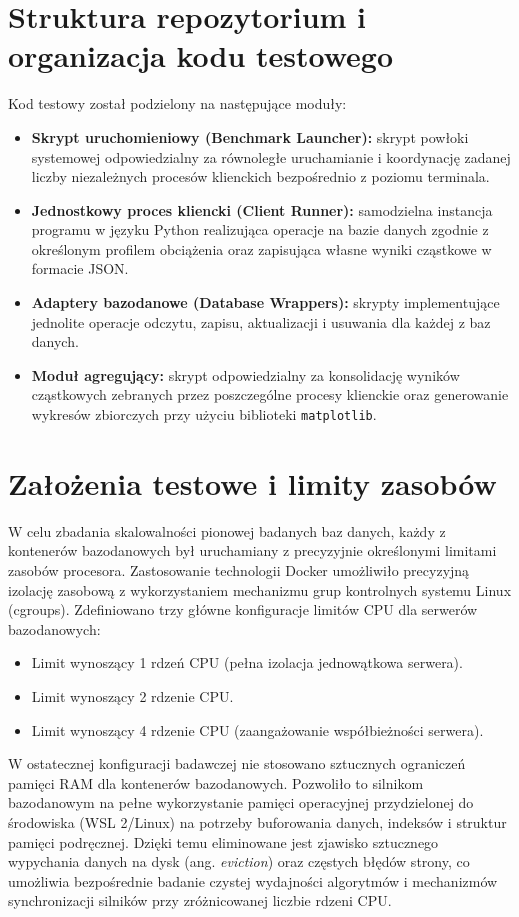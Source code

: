 \section{Struktura repozytorium i organizacja kodu testowego}
Kod testowy został podzielony na następujące moduły:
\begin{itemize}
    \item \textbf{Skrypt uruchomieniowy (Benchmark Launcher):} skrypt powłoki systemowej odpowiedzialny za równoległe uruchamianie i koordynację zadanej liczby niezależnych procesów klienckich bezpośrednio z poziomu terminala.
    \item \textbf{Jednostkowy proces kliencki (Client Runner):} samodzielna instancja programu w języku Python realizująca operacje na bazie danych zgodnie z określonym profilem obciążenia oraz zapisująca własne wyniki cząstkowe w formacie JSON.
    \item \textbf{Adaptery bazodanowe (Database Wrappers):} skrypty implementujące jednolite operacje odczytu, zapisu, aktualizacji i usuwania dla każdej z baz danych.
    \item \textbf{Moduł agregujący:} skrypt odpowiedzialny za konsolidację wyników cząstkowych zebranych przez poszczególne procesy klienckie oraz generowanie wykresów zbiorczych przy użyciu biblioteki \texttt{matplotlib}.
\end{itemize}

\section{Założenia testowe i limity zasobów}
W celu zbadania skalowalności pionowej badanych baz danych, każdy z kontenerów bazodanowych był uruchamiany z precyzyjnie określonymi limitami zasobów procesora. Zastosowanie technologii Docker umożliwiło precyzyjną izolację zasobową z wykorzystaniem mechanizmu grup kontrolnych systemu Linux (cgroups). Zdefiniowano trzy główne konfiguracje limitów CPU dla serwerów bazodanowych:
\begin{itemize}
    \item Limit wynoszący 1 rdzeń CPU (pełna izolacja jednowątkowa serwera).
    \item Limit wynoszący 2 rdzenie CPU.
    \item Limit wynoszący 4 rdzenie CPU (zaangażowanie współbieżności serwera).
\end{itemize}
W ostatecznej konfiguracji badawczej nie stosowano sztucznych ograniczeń pamięci RAM dla kontenerów bazodanowych. Pozwoliło to silnikom bazodanowym na pełne wykorzystanie pamięci operacyjnej przydzielonej do środowiska (WSL 2/Linux) na potrzeby buforowania danych, indeksów i struktur pamięci podręcznej. Dzięki temu eliminowane jest zjawisko sztucznego wypychania danych na dysk (ang. \emph{eviction}) oraz częstych błędów strony, co umożliwia bezpośrednie badanie czystej wydajności algorytmów i mechanizmów synchronizacji silników przy zróżnicowanej liczbie rdzeni CPU.

